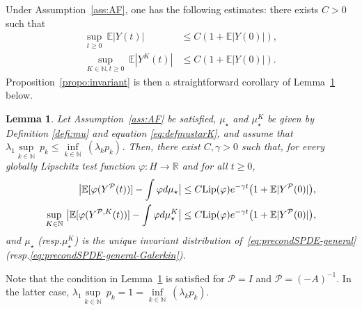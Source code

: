 \documentclass[11pt]{amsart}
\newcommand{\E}{\mathbb{E}}
\newcommand{\ts}{\thinspace}
\newcommand{\R}{\mathbb{R}}
\newcommand{\N}{\mathbb{N}}
\newtheorem{lemma}[theo]{Lemma}
\begin{document}
Under Assumption~\ref{ass:AF}, one has the following estimates: there exists $C>0$ such that
\begin{align}\label{eq:momentY}
\underset{t\ge 0}\sup~\E|Y(t)|&\le C(1+\E|Y(0)|),\\
\label{eq:momentYK}
\underset{K\in\N,t\ge 0}\sup~\E|Y^K(t)|&\le C(1+\E|Y(0)|).
\end{align}
Proposition~\ref{propo:invariant} is then a straightforward corollary of Lemma~\ref{propo:invariant-general} below.

\begin{lemma}\label{propo:invariant-general}
Let Assumption~\ref{ass:AF} be satisfied, $\mu_\star$ and $\mu_\star^K$ be given by Definition \ref{defi:mu} and equation \eqref{eq:defmustarK}, and assume that $\lambda_1\underset{k\in\N}\sup~p_k\le \underset{k\in\N}\inf~(\lambda_kp_k)$.
%
Then, there exist $C,\gamma>0$ such that, for every globally Lipschitz test function $\varphi:H\to\R$ and for all $t\ge 0$,
\begin{align*}
\big|\E[\varphi(Y^{\mathcal{P}}(t))]-\int \varphi d\mu_\star\big|&\le C{\rm Lip}(\varphi)e^{-\gamma t}\bigl(1+\E|Y^{\mathcal{P}}(0)|\bigr),\\
\underset{K\in\N}\sup ~\big|\E[\varphi(Y^{\mathcal{P},K}(t))]-\int \varphi d\mu_\star^K\big|&\le C{\rm Lip}(\varphi)e^{-\gamma t}\bigl(1+\E|Y^{\mathcal{P}}(0)|\bigr),
\end{align*}
and $\mu_\star$ (resp.\ts $\mu_\star^K$) is the unique invariant distribution of~\eqref{eq:precondSPDE-general} (resp.\ts \eqref{eq:precondSPDE-general-Galerkin}).
\end{lemma}

Note that the condition in Lemma~\ref{propo:invariant-general} is satisfied for $\mathcal{P}=I$ and $\mathcal{P}=(-A)^{-1}$. In the latter case, $\lambda_1\underset{k\in\N}\sup~p_k=1=\underset{k\in\N}\inf~(\lambda_kp_k)$.
\end{document}
